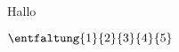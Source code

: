 \documentclass[a4paper]{article}
\begin{document}
Hallo
\tracingall
\vrule\musixrestsixtyfour\vrule
\vrule\musixmaxima\vrule
\vrule\musixlonga\vrule
\vrule\musixbreve\vrule
\vrule\musixwq\vrule
\vrule\musixwqq\vrule
\vrule\musixShake\vrule

$\entfaltung{1}{2}{3}{4}{5}$
\end{document}
